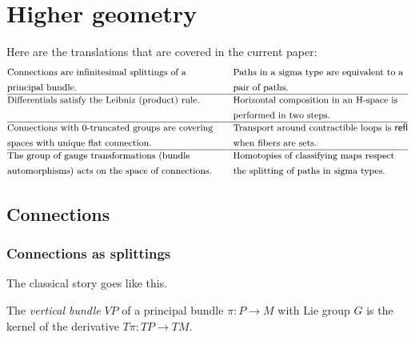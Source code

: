 \section{Higher geometry}

Here are the translations that are covered in the current paper:
\begin{align*}
& \text{\small Connections are infinitesimal splittings of a} & \quad &\text{\small Paths in a sigma type are equivalent to a}        \\
& \text{\small principal bundle.} & \quad&\text{\small pair of paths.}        \\ \hline
& \text{\small Differentials satisfy the Leibniz (product) rule.} &\quad  &\text{\small Horizontal composition in an H-space is} \\ 
&  &  \quad&\text{\small performed in two steps.} \\ \hline
& \text{\small Connections with 0-truncated groups are covering}        &\quad &\text{\small Transport around contractible loops is } \mathsf{refl}             \\ 
& \text{\small spaces with unique flat connection.}        & \quad&\text{\small when fibers are sets.}             \\ \hline
& \text{\small The group of gauge transformations (bundle} &\quad &\text{\small Homotopies of classifying maps respect } \\ 
& \text{\small automorphisms) acts on the space of connections.} & \quad&\text{\small the splitting of paths in sigma types.} \\ 
\end{align*}

\subsection{Connections}



\subsubsection{Connections as splittings}

The classical story goes like this.

\begin{mydef}
The \emph{vertical bundle} \( VP \) of a principal bundle \( \pi:P\to M \) with Lie group \( G \) is the kernel of the derivative \( T\pi:TP\to TM \). 
\end{mydef}


